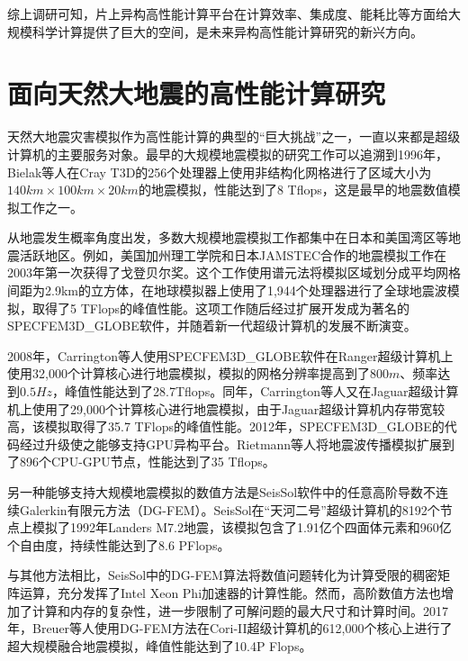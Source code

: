 综上调研可知，片上异构高性能计算平台在计算效率、集成度、能耗比等方面给大规模科学计算提供了巨大的空间，是未来异构高性能计算研究的新兴方向。

\section{面向天然大地震的高性能计算研究}

天然大地震灾害模拟作为高性能计算的典型的“巨大挑战”之一，一直以来都是超级计算机的主要服务对象。最早的大规模地震模拟的研究工作可以追溯到1996年，Bielak等人在Cray T3D的256个处理器上使用非结构化网格进行了区域大小为$140km \times 100km \times 20km$的地震模拟\citep{bao1996earthquake}，性能达到了8 Tflops，这是最早的地震数值模拟工作之一。

从地震发生概率角度出发，多数大规模地震模拟工作都集中在日本和美国湾区等地震活跃地区。例如，美国加州理工学院和日本JAMSTEC合作的地震模拟工作在2003年第一次获得了戈登贝尔奖\citep{es-gb-2003}。这个工作使用谱元法\cite{chen2006glueball}将模拟区域划分成平均网格间距为2.9km的立方体，在地球模拟器上使用了1,944个处理器进行了全球地震波模拟，取得了5 TFlops的峰值性能。这项工作随后经过扩展开发成为著名的SPECFEM3D\_GLOBE软件\cite{bozdag2010specfem3d_globe}，并随着新一代超级计算机的发展不断演变。

2008年，Carrington等人使用SPECFEM3D\_GLOBE软件在Ranger超级计算机上使用32,000个计算核心进行地震模拟\cite{carrington2008high}，模拟的网格分辨率提高到了$800m$、频率达到$0.5Hz$，峰值性能达到了28.7Tflops。同年，Carrington等人又在Jaguar超级计算机上使用了29,000个计算核心进行地震模拟，由于Jaguar超级计算机内存带宽较高，该模拟取得了35.7 TFlops的峰值性能。2012年，SPECFEM3D\_GLOBE的代码经过升级使之能够支持GPU异构平台。Rietmann等人将地震波传播模拟扩展到了896个CPU-GPU节点\citep{rietmann2012forward}，性能达到了35 Tflops。

另一种能够支持大规模地震模拟的数值方法是SeisSol软件中的任意高阶导数不连续Galerkin有限元方法\cite{godel2010scalability}（DG-FEM）。SeisSol在“天河二号”超级计算机的8192个节点上模拟了1992年Landers M7.2地震\citep{tianhe2-2014gb}，该模拟包含了1.91亿个四面体元素和960亿个自由度，持续性能达到了8.6 PFlops。

与其他方法相比，SeisSol中的DG-FEM算法将数值问题转化为计算受限的稠密矩阵运算，充分发挥了Intel Xeon Phi加速器的计算性能。然而，高阶数值方法也增加了计算和内存的复杂性，进一步限制了可解问题的最大尺寸和计算时间。2017年，Breuer等人使用DG-FEM方法在Cori-II超级计算机的612,000个核心上进行了超大规模融合地震模拟\citep{breuer2017edge}，峰值性能达到了10.4P Flops。

